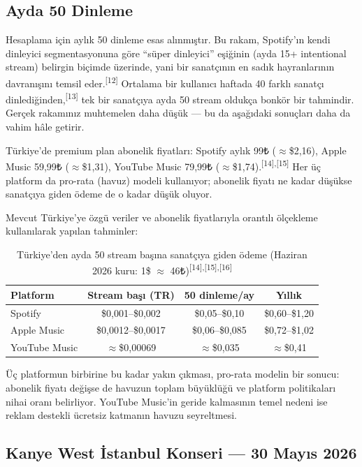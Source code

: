 \documentclass{article}
\begin{document}
\subsection*{Ayda 50 Dinleme}

Hesaplama için aylık 50 dinleme esas alınmıştır. Bu rakam, Spotify'ın kendi dinleyici segmentasyonuna göre ``süper dinleyici'' eşiğinin (ayda 15+ intentional stream) belirgin biçimde üzerinde, yani bir sanatçının en sadık hayranlarının davranışını temsil eder.\textsuperscript{[12]} Ortalama bir kullanıcı haftada 40 farklı sanatçı dinlediğinden,\textsuperscript{[13]} tek bir sanatçıya ayda 50 stream oldukça bonkör bir tahmindir. Gerçek rakamınız muhtemelen daha düşük --- bu da aşağıdaki sonuçları daha da vahim hâle getirir.

Türkiye'de premium plan abonelik fiyatları: Spotify aylık 99₺ ($\approx$\$2,16), Apple Music 59,99₺ ($\approx$\$1,31), YouTube Music 79,99₺ ($\approx$\$1,74).\textsuperscript{[14],[15]} Her üç platform da pro-rata (havuz) modeli kullanıyor; abonelik fiyatı ne kadar düşükse sanatçıya giden ödeme de o kadar düşük oluyor.

Mevcut Türkiye'ye özgü veriler ve abonelik fiyatlarıyla orantılı ölçekleme kullanılarak yapılan tahminler:

\begin{table}[h]
\centering
\begin{tabular}{lccc}
\toprule
\textbf{Platform} & \textbf{Stream başı (TR)} & \textbf{50 dinleme/ay} & \textbf{Yıllık} \\
\midrule
Spotify       & \$0,001--\$0,002   & \$0,05--\$0,10   & \$0,60--\$1,20 \\
Apple Music   & \$0,0012--\$0,0017 & \$0,06--\$0,085  & \$0,72--\$1,02 \\
YouTube Music & $\approx$\$0,00069 & $\approx$\$0,035 & $\approx$\$0,41 \\
\bottomrule
\end{tabular}
\caption{Türkiye'den ayda 50 stream başına sanatçıya giden ödeme
(Haziran 2026 kuru: 1\$ $\approx$ 46₺)\textsuperscript{[14],[15],[16]}}
\end{table}

Üç platformun birbirine bu kadar yakın çıkması, pro-rata modelin bir sonucu: abonelik fiyatı değişse de havuzun toplam büyüklüğü ve platform politikaları nihai oranı belirliyor. YouTube Music'in geride kalmasının temel nedeni ise reklam destekli ücretsiz katmanın havuzu seyreltmesi.

\subsection*{Kanye West İstanbul Konseri --- 30 Mayıs 2026}
\end{document}
